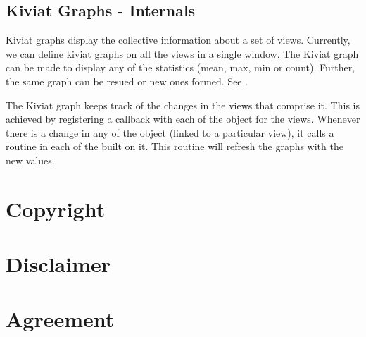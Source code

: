 \subsection{Kiviat Graphs - Internals}

Kiviat graphs display the collective information about a set of views.
Currently, we can define kiviat graphs on all the views in a single
window.  The Kiviat graph can be made to display any of the statistics
(mean, max, min or count).  Further, the same graph can be resued or
new ones formed. See .

The Kiviat graph keeps track of the changes in the views that comprise
it.  This is achieved by registering a callback with each of the
 object for the views. Whenever there is a change in
any of the  object (linked to a particular view), it
calls a routine in each of the  built on it.  This
routine will refresh the graphs with the new values.

\newpage
\section*{Copyright}



\section*{Disclaimer}



\newpage
\section*{Agreement}




